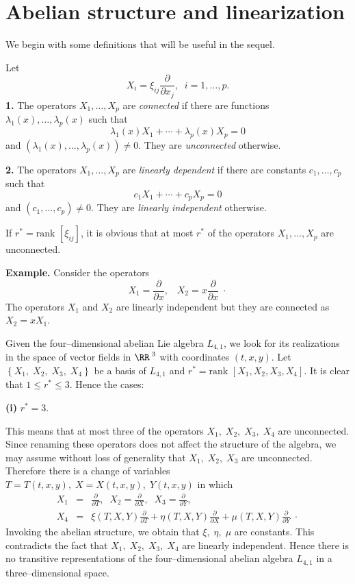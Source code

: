 \section{Abelian structure and linearization}
We begin with some definitions that will be useful in the sequel.
\begin{defi}
\begin{em}
Let
\[X_i=\xi_{ij}\frac{\partial}{\partial x_j},\;\;i=1,\ldots,p.\]
{\bf 1.} The  operators $X_1,\ldots,X_p$ are {\em connected} if there
are  functions $\lambda_1 (x),\ldots,\lambda_p (x)$  such that
\[\lambda_1 (x) X_1+\cdots+\lambda_p (x)X_p=0\]
and $(\lambda_1 (x),\ldots,\lambda_p (x))\ne 0.$
They are {\em unconnected}  otherwise.

{\bf 2.} The operators $X_1,\ldots, X_p $ are
{\em linearly dependent} if there  are constants $c_1,\ldots,c_p$ such that
\[c_1X_1+\cdots+c_pX_p=0\]
and $(c_1,\ldots,c_p)\ne 0$.  They are {\em  linearly independent}  
otherwise.
\end{em}
\end{defi}
If  $r^{*}=\mbox{rank }[\xi_{ij}]$, it is obvious that at most $r^{*}$ 
of the operators $X_1,\ldots,X_p$ are unconnected.

{\bf Example. } Consider the operators
\[X_1=\frac{\partial}{\partial x},\;\;\;X_2=x\frac{\partial}{\partial x}
\;\cdot\]
The operators $X_1$ and $X_2$ are linearly independent but they are
connected as $X_2=xX_1$.

Given the four--dimensional abelian Lie algebra $L_{4,1}$, we look for its  
realizations in the space of vector fields in $\RR^{\;3}$ with coordinates
$(t,x,y)$. Let
$\left \{ X_1,\;X_2,\;X_3,\;X_4 \right \}$ be a basis of $L_{4,1}$ and
$r^{*}=\mbox{rank }[X_1,X_2,X_3,X_4]$. It is clear that $1\le r^{*} \le 3$. 
Hence the cases: 

{\bf (i)} $r^{*}=3.$ 

This means that at most three of the operators $X_1,\;X_2,\;X_3,\;X_4$ are
unconnected. Since renaming these operators does not affect the structure
of the algebra, we may assume without loss of generality that 
$X_1,\;X_2,\;X_3$ are unconnected. Therefore there is a change of variables 
$T=T(t,x,y),\;X=X(t,x,y),\;Y(t,x,y)$ in which
\begin{eqnarray*}
X_1 &=&\frac{\partial}{\partial T},\;\; X_2=\frac{\partial}{\partial X},\;\;
X_3=\frac{\partial}{\partial Y},\\
X_4 &=&\xi(T,X,Y)\frac{\partial}{\partial T}+
\eta (T,X,Y)\frac{\partial}{\partial X}+\mu (T,X,Y)\frac{\partial}{\partial Y}
\;\cdot
\end{eqnarray*}
Invoking the abelian structure, we obtain that $\xi,\;\eta,\;\mu$  are
constants. This contradicts the fact that $X_1,\;X_2,\;X_3,\;X_4$ are
linearly independent. Hence there is no transitive representations of
the four--dimensional abelian algebra $L_{4,1}$ in a three--dimensional space.

